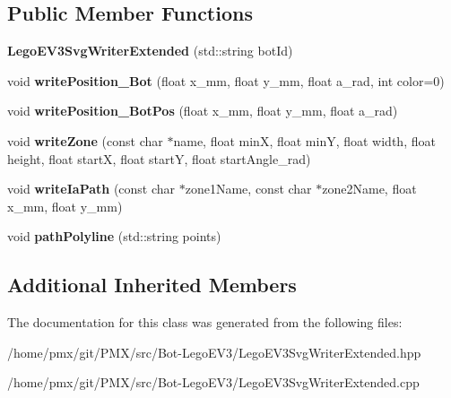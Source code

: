 \subsection*{Public Member Functions}
\begin{DoxyCompactItemize}
\item 
\mbox{\label{classLegoEV3SvgWriterExtended_a12979478b8cad5cfb154465a918348e7}} 
{\bfseries Lego\+E\+V3\+Svg\+Writer\+Extended} (std\+::string bot\+Id)
\item 
\mbox{\label{classLegoEV3SvgWriterExtended_a8213ffab6f078bcd941fcdf0d07e2516}} 
void {\bfseries write\+Position\+\_\+\+Bot} (float x\+\_\+mm, float y\+\_\+mm, float a\+\_\+rad, int color=0)
\item 
\mbox{\label{classLegoEV3SvgWriterExtended_a41202206ab12b9718a844a40c692eca8}} 
void {\bfseries write\+Position\+\_\+\+Bot\+Pos} (float x\+\_\+mm, float y\+\_\+mm, float a\+\_\+rad)
\item 
\mbox{\label{classLegoEV3SvgWriterExtended_a2ae588c16287802e52ceb8291db79b41}} 
void {\bfseries write\+Zone} (const char $\ast$name, float minX, float minY, float width, float height, float startX, float startY, float start\+Angle\+\_\+rad)
\item 
\mbox{\label{classLegoEV3SvgWriterExtended_acc56b8c24c65df5eccfbc23f85d10082}} 
void {\bfseries write\+Ia\+Path} (const char $\ast$zone1\+Name, const char $\ast$zone2\+Name, float x\+\_\+mm, float y\+\_\+mm)
\item 
\mbox{\label{classLegoEV3SvgWriterExtended_ae4e58b38359df2fd863db2ab7c7ac999}} 
void {\bfseries path\+Polyline} (std\+::string points)
\end{DoxyCompactItemize}
\subsection*{Additional Inherited Members}


The documentation for this class was generated from the following files\+:\begin{DoxyCompactItemize}
\item 
/home/pmx/git/\+P\+M\+X/src/\+Bot-\/\+Lego\+E\+V3/Lego\+E\+V3\+Svg\+Writer\+Extended.\+hpp\item 
/home/pmx/git/\+P\+M\+X/src/\+Bot-\/\+Lego\+E\+V3/Lego\+E\+V3\+Svg\+Writer\+Extended.\+cpp\end{DoxyCompactItemize}
